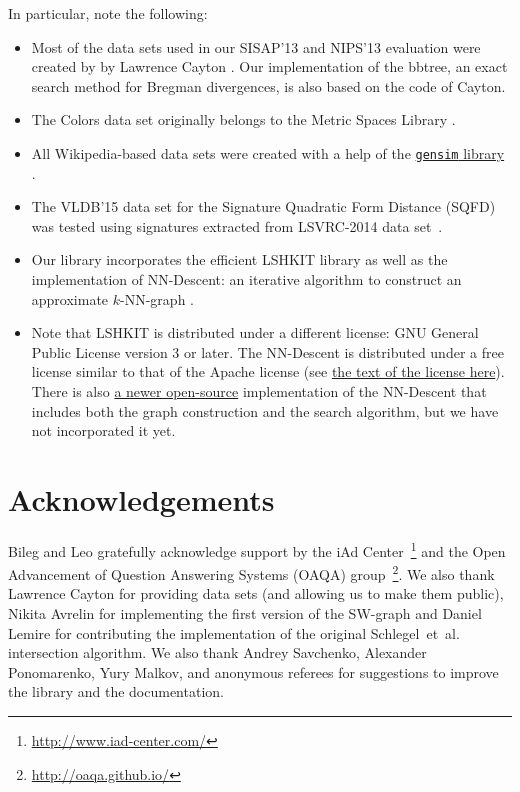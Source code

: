 \documentclass[runningheads,a4paper]{llncs}
\newcommand{\ttt}[1]{\texttt{#1}}
\newcommand{\knnns}{$k$-NN}
\begin{document}
In particular, note the following:
\begin{itemize}
\item Most of the data sets used in our SISAP'13 and NIPS'13
evaluation were created by  by Lawrence Cayton \cite{Cayton2008}.
Our implementation of the bbtree, 
an exact search method for Bregman divergences,
is also based on the code of Cayton.

\item The Colors data set originally belongs to the Metric Spaces Library \cite{LibMetricSpace}.

\item All Wikipedia-based data sets were created with a help of the \href{https://github.com/piskvorky/gensim/}{\ttt{gensim} library} \cite{rehurek_lrec}.

\item The VLDB'15 data set for the Signature Quadratic Form Distance (SQFD) \cite{Beecks:2010,Beecks:2013} 
was tested using signatures extracted from LSVRC-2014 data set~\cite{ILSVRCarxiv14}. 

\item Our library incorporates the efficient LSHKIT library
as well as the implementation of NN-Descent: 
an iterative algorithm to construct an approximate \knnns-graph \cite{dong2011efficient}.

\item Note that LSHKIT is distributed under a different license: 
GNU General Public License version 3 or later. 
The NN-Descent is distributed under a free license similar to
that of the Apache license (see \href{https://code.google.com/p/nndes/source/browse/trunk/LICENSE}{the 
text of the license here}). There is also \href{http://kgraph.org}{a newer open-source}
implementation of the NN-Descent that includes both
the graph construction and the search algorithm, but we have not incorporated it yet.

\end{itemize}

\section{Acknowledgements}
Bileg and Leo gratefully acknowledge support by the iAd Center~\footnote{\url{http://www.iad-center.com/}}
and the Open Advancement of Question Answering Systems (OAQA) group~\footnote{\url{http://oaqa.github.io/}}.
We also thank 
Lawrence Cayton for providing data sets (and allowing us to make them public),
Nikita Avrelin for implementing the first version of the SW-graph
and Daniel Lemire for contributing 
the implementation of the original Schlegel~et~al.~\cite{schlegel2011fast}
intersection algorithm.
We also thank Andrey Savchenko, Alexander Ponomarenko, Yury Malkov,
and anonymous referees for suggestions
to improve the library and the documentation.
\end{document}
